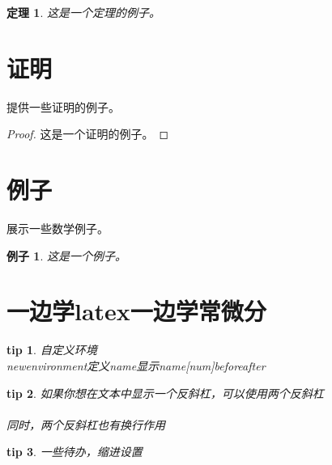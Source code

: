 \documentclass[12pt, a4paper]{article}
\newtheorem{theorem}{定理}[section]
\newtheorem{example}{例子}[section]
\newtheorem{tips}{tip}[section]
\begin{document}
\begin{theorem}
    这是一个定理的例子。
\end{theorem}

\section{证明}
提供一些证明的例子。

\begin{proof}
    这是一个证明的例子。
\end{proof}

\section{例子}
展示一些数学例子。

\begin{example}
    这是一个例子。
\end{example}

\section{一边学latex一边学常微分}

\begin{tips}
自定义环境  
\\newenvironment{定义name}{显示name}[num]{before}{after}  
\end{tips}
\begin{tips}
如果你想在文本中显示一个反斜杠，可以使用两个反斜杠 \\ \\
同时，两个反斜杠也有换行作用
\end{tips}
\begin{tips}
    一些待办，缩进设置
\end{tips}
\end{document}
